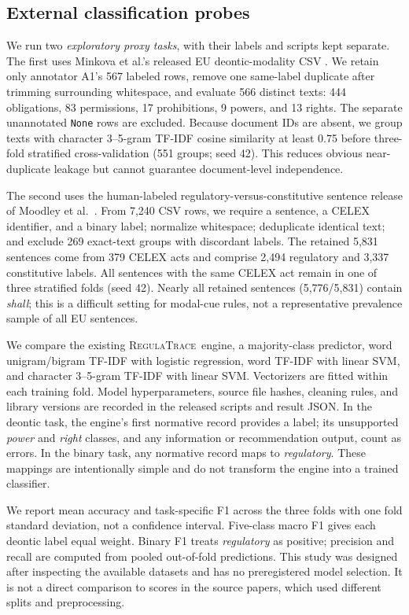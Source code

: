 \documentclass[11pt,a4paper]{article}
\newcommand{\system}{\textsc{RegulaTrace}}
\newcommand{\field}[1]{\texttt{#1}}
\begin{document}
\subsection{External classification probes}
We run two \emph{exploratory proxy tasks}, with their labels and scripts kept separate. The first uses Minkova et al.'s released EU deontic-modality CSV \cite{minkovadata}. We retain only annotator A1's 567 labeled rows, remove one same-label duplicate after trimming surrounding whitespace, and evaluate 566 distinct texts: 444 obligations, 83 permissions, 17 prohibitions, 9 powers, and 13 rights. The separate unannotated \field{None} rows are excluded. Because document IDs are absent, we group texts with character 3--5-gram TF-IDF cosine similarity at least 0.75 before three-fold stratified cross-validation (551 groups; seed 42). This reduces obvious near-duplicate leakage but cannot guarantee document-level independence.

The second uses the human-labeled regulatory-versus-constitutive sentence release of Moodley et al.\ \cite{moodleydata}. From 7,240 CSV rows, we require a sentence, a CELEX identifier, and a binary label; normalize whitespace; deduplicate identical text; and exclude 269 exact-text groups with discordant labels. The retained 5,831 sentences come from 379 CELEX acts and comprise 2,494 regulatory and 3,337 constitutive labels. All sentences with the same CELEX act remain in one of three stratified folds (seed 42). Nearly all retained sentences (5,776/5,831) contain \emph{shall}; this is a difficult setting for modal-cue rules, not a representative prevalence sample of all EU sentences.

We compare the existing \system\ engine, a majority-class predictor, word unigram/bigram TF-IDF with logistic regression, word TF-IDF with linear SVM, and character 3--5-gram TF-IDF with linear SVM. Vectorizers are fitted within each training fold. Model hyperparameters, source file hashes, cleaning rules, and library versions are recorded in the released scripts and result JSON. In the deontic task, the engine's first normative record provides a label; its unsupported \emph{power} and \emph{right} classes, and any information or recommendation output, count as errors. In the binary task, any normative record maps to \emph{regulatory}. These mappings are intentionally simple and do not transform the engine into a trained classifier.

We report mean accuracy and task-specific F1 across the three folds with one fold standard deviation, not a confidence interval. Five-class macro F1 gives each deontic label equal weight. Binary F1 treats \emph{regulatory} as positive; precision and recall are computed from pooled out-of-fold predictions. This study was designed after inspecting the available datasets and has no preregistered model selection. It is not a direct comparison to scores in the source papers, which used different splits and preprocessing.
\end{document}
